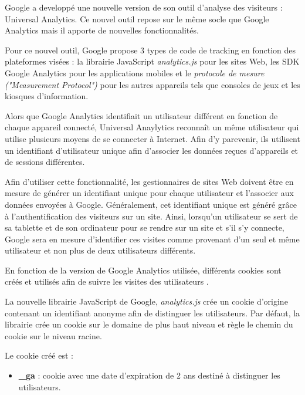 Google a developpé une nouvelle version de son outil d'analyse des visiteurs : Universal Analytics. Ce nouvel outil repose sur le même socle que Google Analytics mais il apporte de nouvelles fonctionnalités.

Pour ce nouvel outil, Google propose 3 types de code de tracking en fonction des plateformes visées : la librairie JavaScript \textit{analytics.js} pour les sites Web, les SDK Google Analytics pour les applications mobiles et le \textit{protocole de mesure ("Measurement Protocol")} pour les autres appareils tels que consoles de jeux et les kiosques d'information.
\newline

Alors que Google Analytics identifiait un utilisateur différent en fonction de chaque appareil connecté, Universal Anaylytics reconnaît un même utilisateur qui utilise plusieurs moyens de se connecter à Internet. Afin d'y parevenir, ils utilisent un identifiant d'utilisateur unique afin d'associer les données reçues d'appareils et de sessions différentes.

Afin d'utiliser cette fonctionnalité, les gestionnaires de sites Web doivent être en mesure de générer un identifiant unique pour chaque utilisateur et l'associer aux données envoyées à Google. Généralement, cet identifiant unique est généré grâce à l'authentification des visiteurs sur un site. Ainsi, lorsqu'un utilisateur se sert de sa tablette et de son ordinateur pour se rendre sur un site et s'il s'y connecte, Google sera en mesure d'identifier ces visites comme provenant d'un seul et même utilisateur et non plus de deux utilisateurs différents.
\newline

En fonction de la version de Google Analytics utilisée, différents cookies sont créés et utilisés afin de suivre les visites des utilisateurs \cite{Google_Analytics_cookies}.
\newline

La nouvelle librairie JavaScript de Google, \textit{analytics.js} crée un cookie d'origine contenant un identifiant anonyme afin de distinguer les utilisateurs. Par défaut, la librairie crée un cookie sur le domaine de plus haut niveau et règle le chemin du cookie sur le niveau racine.

Le cookie créé est :
\begin{itemize}
  \item \textbf{\_ga} : cookie avec une date d'expiration de 2 ans destiné à distinguer les utilisateurs.
  \newline
\end{itemize}

